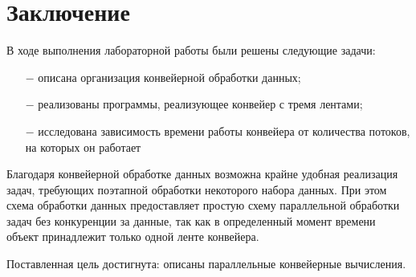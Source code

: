 \chapter*{Заключение}
В ходе выполнения лабораторной работы были решены следующие
задачи:
\begin{itemize}
  \item[$-$] описана организация конвейерной обработки данных;
  \item[$-$] реализованы программы, реализующее конвейер с тремя лентами;
  \item[$-$] исследована зависимость времени работы конвейера от количества потоков, на которых он работает
\end{itemize}

Благодаря конвейерной обработке данных возможна крайне удобная реализация задач, требующих поэтапной обработки некоторого набора данных. При этом схема обработки данных предоставляет простую схему параллельной обработки задач без конкуренции за данные, так как в определенный момент времени объект принадлежит только одной ленте конвейера.

Поставленная цель достигнута: описаны параллельные конвейерные
вычисления.

